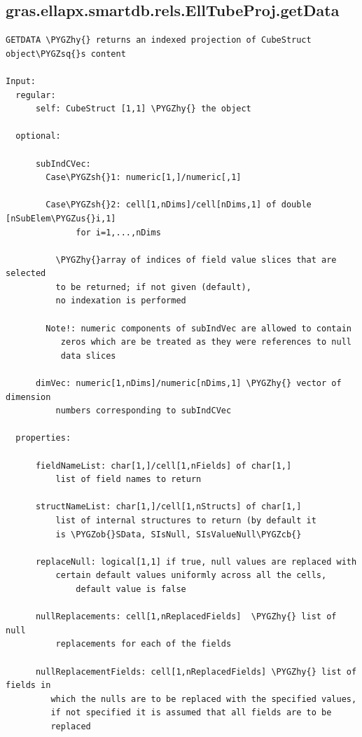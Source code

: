 \documentclass[letterpaper,10pt,english]{sphinxmanual}
\def\PYGZus{\char`\_}
\def\PYGZob{\char`\{}
\def\PYGZcb{\char`\}}
\def\PYGZsh{\char`\#}
\def\PYGZhy{\char`\-}
\def\PYGZsq{\char`\'}
\begin{document}
\subsection{gras.ellapx.smartdb.rels.EllTubeProj.getData}
\label{chap_functions:gras-ellapx-smartdb-rels-elltubeproj-getdata}
\begin{Verbatim}[commandchars=\\\{\}]
GETDATA \PYGZhy{} returns an indexed projection of CubeStruct object\PYGZsq{}s content

Input:
  regular:
      self: CubeStruct [1,1] \PYGZhy{} the object

  optional:

      subIndCVec:
        Case\PYGZsh{}1: numeric[1,]/numeric[,1]

        Case\PYGZsh{}2: cell[1,nDims]/cell[nDims,1] of double [nSubElem\PYGZus{}i,1]
              for i=1,...,nDims

          \PYGZhy{}array of indices of field value slices that are selected
          to be returned; if not given (default),
          no indexation is performed

        Note!: numeric components of subIndVec are allowed to contain
           zeros which are be treated as they were references to null
           data slices

      dimVec: numeric[1,nDims]/numeric[nDims,1] \PYGZhy{} vector of dimension
          numbers corresponding to subIndCVec

  properties:

      fieldNameList: char[1,]/cell[1,nFields] of char[1,]
          list of field names to return

      structNameList: char[1,]/cell[1,nStructs] of char[1,]
          list of internal structures to return (by default it
          is \PYGZob{}SData, SIsNull, SIsValueNull\PYGZcb{}

      replaceNull: logical[1,1] if true, null values are replaced with
          certain default values uniformly across all the cells,
              default value is false

      nullReplacements: cell[1,nReplacedFields]  \PYGZhy{} list of null
          replacements for each of the fields

      nullReplacementFields: cell[1,nReplacedFields] \PYGZhy{} list of fields in
         which the nulls are to be replaced with the specified values,
         if not specified it is assumed that all fields are to be
         replaced


\end{Verbatim}
\end{document}

